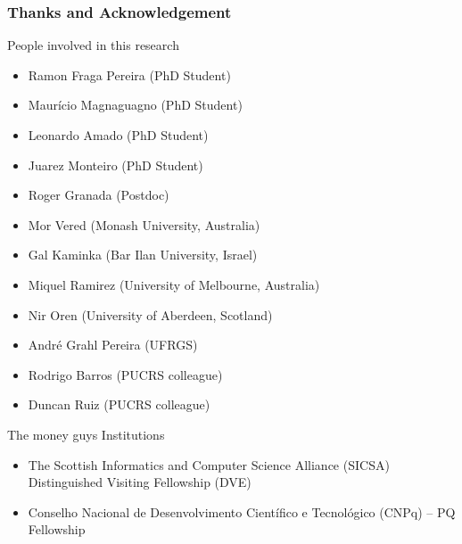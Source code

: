 \documentclass[usenames,dvipsnames]{beamer}
\begin{document}
\begin{frame}[c]\frametitle{Thanks and Acknowledgement}
	People involved in this research
	\begin{itemize}
		\item Ramon Fraga Pereira (PhD Student)
		\item Maurício Magnaguagno (PhD Student)
		\item Leonardo Amado (PhD Student)
		\item Juarez Monteiro (PhD Student)
		\item Roger Granada (Postdoc)
		\item Mor Vered (Monash University, Australia)
		\item Gal Kaminka (Bar Ilan University, Israel)
		\item Miquel Ramirez (University of Melbourne, Australia) 
		\item Nir Oren (University of Aberdeen, Scotland)
		\item André Grahl Pereira (UFRGS)
		\item Rodrigo Barros (PUCRS colleague) 
		\item Duncan Ruiz (PUCRS colleague) 
	\end{itemize}
\end{frame}

\begin{frame}[c]{The money guys}
	Institutions
	\begin{itemize}
		\item The Scottish Informatics and Computer Science Alliance (SICSA) \\ Distinguished Visiting Fellowship (DVE)
		\item Conselho Nacional de Desenvolvimento Científico e Tecnológico (CNPq) -- PQ Fellowship
	\end{itemize}
\end{frame}
\end{document}
